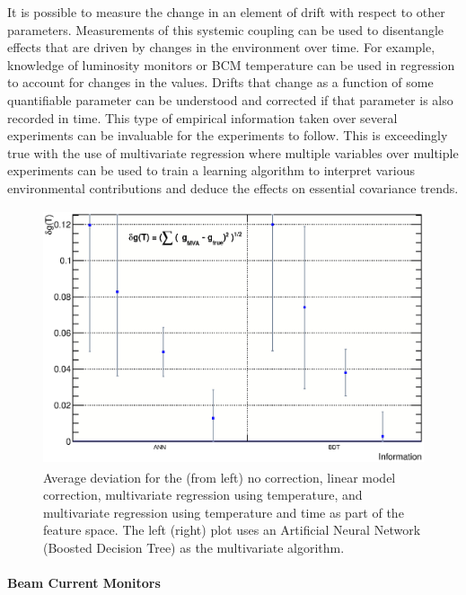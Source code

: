It is possible to measure the change in an element of drift with respect to other parameters.  Measurements of this systemic coupling
can be used to disentangle effects that are driven by changes in the environment over time.  For example, knowledge of luminosity monitors or BCM temperature
can be used in regression to account for changes in the values.  Drifts that change as a function of some quantifiable parameter can be understood
and corrected if that parameter is also recorded in time.  This type of empirical information taken over several experiments can be invaluable 
for the experiments to follow.  This is exceedingly true with the use of multivariate regression where multiple variables over multiple experiments can be used to train a learning algorithm to interpret various environmental contributions and deduce the effects on essential covariance trends.  %

\begin{figure}
\begin{center}
\includegraphics[height=75mm, angle=0]{./figs/Regression}
\end{center}
\caption{Average deviation for the (from left) no correction, linear model correction, multivariate regression using temperature, and multivariate regression using temperature and time as part of the feature space.  The left (right) plot uses an Artificial Neural Network (Boosted Decision Tree) as the multivariate algorithm.}
\label{regression}
\end{figure}
\fi


\paragraph{Beam Current Monitors}\mbox{}

